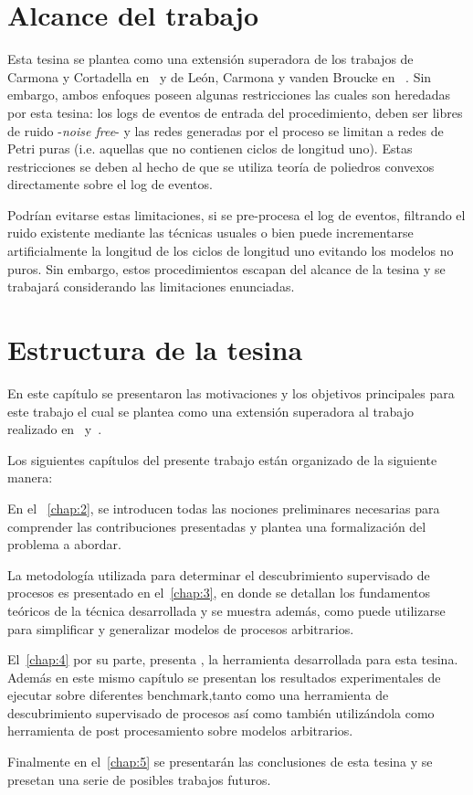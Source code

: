 \section{Alcance del trabajo}
\label{sec:alcance}

Esta tesina se plantea como una extensión superadora de los trabajos de Carmona y Cortadella en~\cite{CarmonaC14}
y de León, Carmona y vanden Broucke en ~\cite{LeonCB15}. 
Sin embargo, ambos enfoques poseen algunas restricciones las cuales son heredadas por esta tesina:
los logs de eventos de entrada del procedimiento, deben ser libres de ruido -\textit{noise free}- y las redes generadas
por el proceso se limitan a redes de Petri puras (i.e. aquellas que no contienen ciclos de longitud uno).
Estas restricciones se deben al hecho de que se utiliza teoría de poliedros convexos directamente sobre el log de eventos.

Podrían evitarse estas limitaciones, si se  pre-procesa el log de eventos, filtrando el ruido existente mediante las 
técnicas usuales o bien puede incrementarse artificialmente la longitud de los ciclos de longitud uno evitando los modelos 
no puros. Sin embargo, estos procedimientos escapan del alcance de la tesina y se trabajará considerando las limitaciones
enunciadas.

\section{Estructura de la tesina}
\label{sec:estructura}

En este capítulo se presentaron las motivaciones y los objetivos principales para este trabajo el cual se
plantea como una extensión superadora al trabajo realizado en~\cite{CarmonaC14} y~\cite{LeonCB15}.


Los siguientes capítulos del presente trabajo están organizado de la siguiente manera:

En el ~\autoref{chap:2}, se introducen todas las nociones preliminares necesarias para comprender las contribuciones 
presentadas y plantea una formalización del problema a abordar.

La metodología utilizada para determinar el descubrimiento supervisado de procesos es presentado en el~\autoref{chap:3}, 
en donde se detallan los fundamentos teóricos de la técnica desarrollada y se muestra además, como puede utilizarse para simplificar
y generalizar modelos de procesos arbitrarios.

El~\autoref{chap:4} por su parte, presenta \pachtool, la herramienta desarrollada para esta tesina. Además en este mismo capítulo
se presentan los resultados experimentales de ejecutar \pachtool sobre diferentes benchmark,tanto como una herramienta de descubrimiento
supervisado de procesos así como también utilizándola como herramienta de post procesamiento sobre modelos arbitrarios.

Finalmente en el~\autoref{chap:5} se presentarán las conclusiones de esta tesina y se presetan una serie de posibles trabajos futuros.
